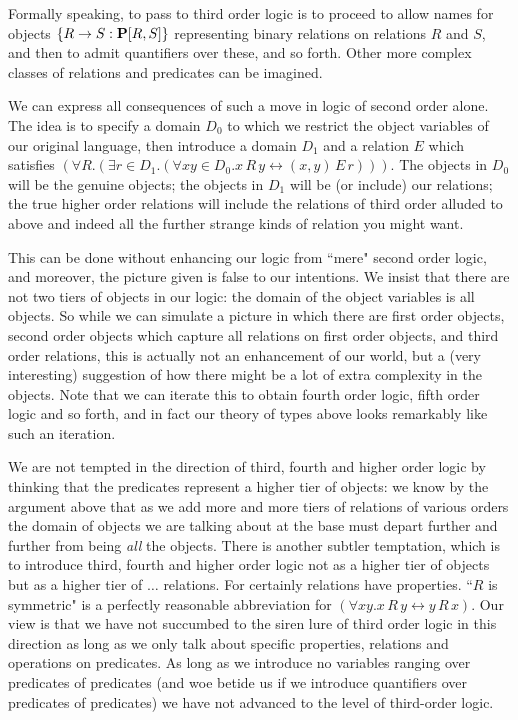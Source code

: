 \documentclass[12pt]{book}
\begin{document}
Formally speaking, to pass to third order logic is to proceed to allow names for objects $\{R \rightarrow S:{\bf P}[R,S]\}$ representing
binary relations on relations $R$ and $S$, and then to admit quantifiers over these, and so forth.  Other more complex classes of relations
and predicates can be imagined.  

We can express all consequences of such a move in logic of second order alone.  The idea is to specify a domain $D_0$ to which we restrict
the object variables of our original language, then introduce a domain $D_1$ and a relation $E$ which satisfies $(\forall R.(\exists r \in D_1.(\forall xy \in D_0.x \,R\,y \leftrightarrow (x,y)\,E\,r)))$.  The objects in $D_0$ will be the genuine objects; the objects in $D_1$ will be (or include) our
relations; the true higher order relations will include the relations of third order alluded to above and indeed all the further strange kinds of relation you might want.

This can be done without enhancing our logic from ``mere" second order logic, and moreover, the picture given is false to our intentions.  We insist
that there are not two tiers of objects in our logic:  the domain of the object variables is all objects.  So while we can simulate a picture in which there
are first order objects, second order objects which capture all relations on first order objects, and third order relations, this is actually not
an enhancement of our world, but a (very interesting) suggestion of how there might be a lot of extra complexity in the objects.  Note that we
can iterate this to obtain fourth order logic, fifth order logic and so forth, and in fact our theory of types  above looks remarkably like such an iteration.

We are not tempted in the direction of third, fourth and higher order logic by thinking that the predicates represent a higher tier of objects:  we know by the argument above that as we add more and more tiers of relations of various orders the domain of objects we are talking about at the base must depart further and further from being {\em all\/} the objects.  There is another subtler temptation, which is to introduce third, fourth and higher order logic not as a higher tier of objects but as a higher tier of $\ldots$ relations.  For certainly relations have properties.  ``$R$ is symmetric" is a perfectly reasonable abbreviation for $(\forall xy.x\,R\,y \leftrightarrow y\,R\,x)$.  Our view is that we have not succumbed to the siren lure of third order logic in this direction as long as we only talk about specific
properties, relations and operations on predicates.  As long as we introduce no variables ranging over predicates of predicates (and woe betide us if we introduce quantifiers over predicates of predicates) we have not advanced to the level of third-order logic.
\end{document}
